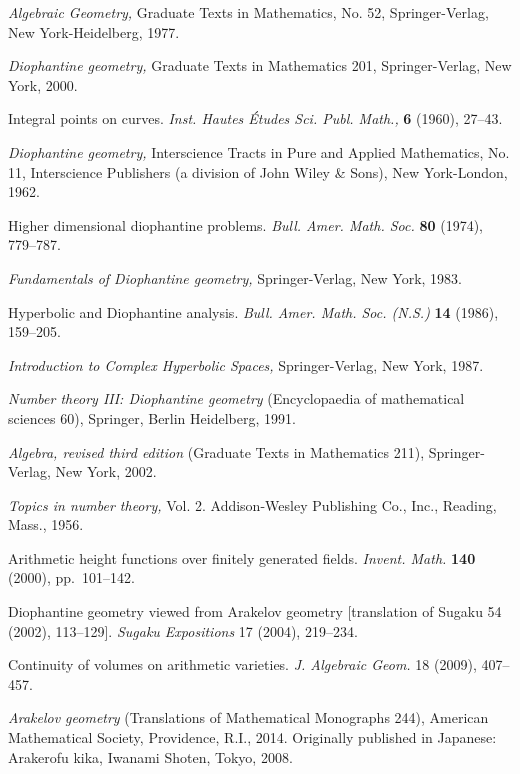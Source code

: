  {\it Algebraic Geometry,} Graduate Texts in Mathematics, No. 52,
  Springer-Verlag, New York-Heidelberg, 1977.

 {\it Diophantine geometry,} Graduate Texts in Mathematics 201,
  Springer-Verlag, New York, 2000.

  Integral points on curves.
  {\it Inst. Hautes \'Etudes Sci. Publ. Math.,} {\bf 6} (1960), 27--43.

 {\it Diophantine geometry,}
  Interscience Tracts in Pure and Applied Mathematics, No. 11,
  Interscience Publishers (a division of John Wiley \& Sons), New York-London,
  1962.

  Higher dimensional diophantine problems.
  {\it Bull. Amer. Math. Soc.} {\bf 80} (1974), 779--787.

  {\it Fundamentals of {D}iophantine geometry,}
  Springer-Verlag, New York, 1983.

  Hyperbolic and Diophantine analysis.
  {\it Bull. Amer. Math. Soc. (N.S.)\/} {\bf 14} (1986), 159--205.

  {\it Introduction to Complex Hyperbolic Spaces,}
  Springer-Verlag, New York, 1987.

  {\it Number theory {III}:  {D}iophantine geometry\/}
  (Encyclopaedia of mathematical sciences 60),\break%
  Springer, Berlin Heidelberg, 1991.

  {\it Algebra, revised third edition\/}
  (Graduate Texts in Mathematics 211), Springer-Verlag, New York, 2002.

  {\it Topics in number theory,} Vol. 2.
  Addison-Wesley Publishing Co., Inc., Reading, Mass., 1956.

 Arithmetic height functions over finitely generated fields.
  {\it Invent. Math.} {\bf 140} (2000), pp.~101--142.

 Diophantine geometry viewed from Arakelov geometry
  [translation of Sugaku 54 (2002), 113--129].
  {\it Sugaku Expositions} 17 (2004), 219--234.

 Continuity of volumes on arithmetic varieties.
  {\it J. Algebraic Geom.} 18 (2009), 407--457.

 {\it Arakelov geometry\/}
  (Translations of Mathematical Monographs 244),
  American Mathematical Society, Providence, R.I., 2014.
  Originally published in Japanese:
  Arakerofu kika, Iwanami Shoten, Tokyo, 2008.

